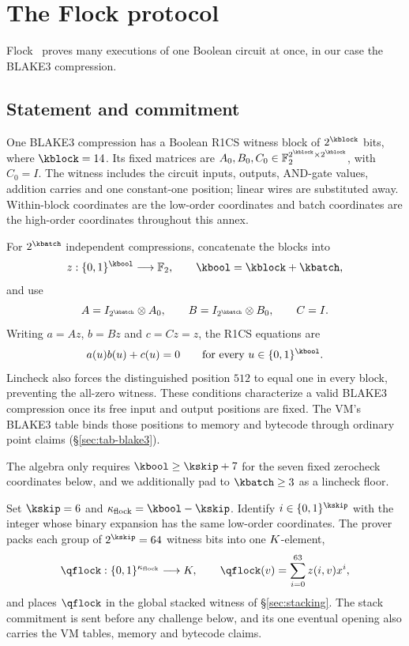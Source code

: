 \section{The Flock protocol}\label{annex:flock}

Flock~\cite{Flock26} proves many executions of one Boolean circuit at once, in our case the BLAKE3 compression.

\subsection{Statement and commitment}\label{flock:statement}

One BLAKE3 compression has a Boolean R1CS witness block of $2^{\kblock}$ bits, where $\kblock=14$. Its fixed matrices are $A_0,B_0,C_0\in\Ftwo^{2^{\kblock}\times 2^{\kblock}}$, with $C_0=I$. The witness includes the circuit inputs, outputs, AND-gate values, addition carries and one constant-one position; linear wires are substituted away. Within-block coordinates are the low-order coordinates and batch coordinates are the high-order coordinates throughout this annex.

For $2^{\kbatch}$ independent compressions, concatenate the blocks into
\[
z:\cube{\kbool}\longrightarrow\Ftwo,\qquad \kbool=\kblock+\kbatch,
\]
and use
\[
A=I_{2^{\kbatch}}\otimes A_0,\qquad B=I_{2^{\kbatch}}\otimes B_0,\qquad C=I.
\]
Writing $a=Az$, $b=Bz$ and $c=Cz=z$, the R1CS equations are
\begin{equation}\label{flock:eq:r1cs}
a(u)b(u)+c(u)=0\qquad\text{for every }u\in\cube{\kbool}.
\end{equation}
Lincheck also forces the distinguished position $512$ to equal one in every block, preventing the all-zero witness. These conditions characterize a valid BLAKE3 compression once its free input and output positions are fixed. The VM's BLAKE3 table binds those positions to memory and bytecode through ordinary point claims (\S\ref{sec:tab-blake3}).

The algebra only requires $\kbool\geq\kskip+7$ for the seven fixed zerocheck coordinates below, and we additionally pad to $\kbatch\geq3$ as a lincheck floor.

Set $\kskip=6$ and $\nflock=\kbool-\kskip$. Identify $i\in\cube{\kskip}$ with the integer whose binary expansion has the same low-order coordinates. The prover packs each group of $2^{\kskip}=64$ witness bits into one $K$-element,
\[
\qflock:\cube{\nflock}\longrightarrow\K,\qquad \qflock(v)=\sum_{i=0}^{63}z(i,v)x^i,
\]
and places $\qflock$ in the global stacked witness of \S\ref{sec:stacking}. The stack commitment is sent before any challenge below, and its one eventual opening also carries the VM tables, memory and bytecode claims.



